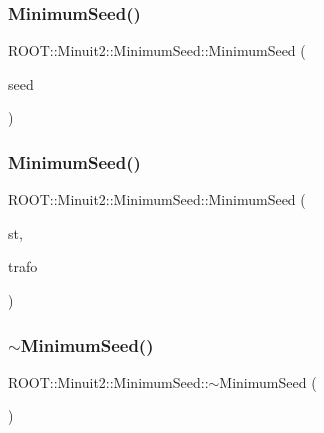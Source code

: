 \subsubsection{\texorpdfstring{MinimumSeed()}{MinimumSeed()}\hspace{0.1cm}{\footnotesize\ttfamily [2/6]}}
{\footnotesize\ttfamily R\+O\+O\+T\+::\+Minuit2\+::\+Minimum\+Seed\+::\+Minimum\+Seed (\begin{DoxyParamCaption}\item[{const \mbox{\hyperlink{classROOT_1_1Minuit2_1_1MinimumSeed}{Minimum\+Seed}} \&}]{seed }\end{DoxyParamCaption})\hspace{0.3cm}{\ttfamily [inline]}}

\mbox{\label{classROOT_1_1Minuit2_1_1MinimumSeed_a0d3070cfaa1be8ce9e9e64f39a30b875}} 
\subsubsection{\texorpdfstring{MinimumSeed()}{MinimumSeed()}\hspace{0.1cm}{\footnotesize\ttfamily [3/6]}}
{\footnotesize\ttfamily R\+O\+O\+T\+::\+Minuit2\+::\+Minimum\+Seed\+::\+Minimum\+Seed (\begin{DoxyParamCaption}\item[{const \mbox{\hyperlink{classROOT_1_1Minuit2_1_1MinimumState}{Minimum\+State}} \&}]{st,  }\item[{const \mbox{\hyperlink{classROOT_1_1Minuit2_1_1MnUserTransformation}{Mn\+User\+Transformation}} \&}]{trafo }\end{DoxyParamCaption})\hspace{0.3cm}{\ttfamily [inline]}}

\mbox{\label{classROOT_1_1Minuit2_1_1MinimumSeed_a99b95b10842f335d10bf7293f7d91b92}} 
\subsubsection{\texorpdfstring{$\sim$MinimumSeed()}{~MinimumSeed()}\hspace{0.1cm}{\footnotesize\ttfamily [2/3]}}
{\footnotesize\ttfamily R\+O\+O\+T\+::\+Minuit2\+::\+Minimum\+Seed\+::$\sim$\+Minimum\+Seed (\begin{DoxyParamCaption}{ }\end{DoxyParamCaption})\hspace{0.3cm}{\ttfamily [inline]}}

